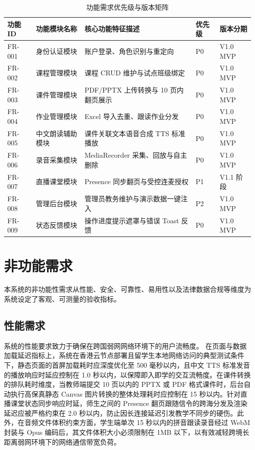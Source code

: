 \begin{table}[H]
\centering
\caption{功能需求优先级与版本矩阵}
\begin{tabularx}{\textwidth}{l l X l l}
\toprule
\textbf{功能 ID} & \textbf{功能模块名称} & \textbf{核心功能特征描述} & \textbf{优先级} & \textbf{版本分期} \\
\midrule
FR-001 & 身份认证模块 & 账户登录、角色识别与重定向 & P0 & V1.0 MVP \\
FR-002 & 课程管理模块 & 课程 CRUD 维护与试点班级绑定 & P0 & V1.0 MVP \\
FR-003 & 课件管理模块 & PDF/PPTX 上传转换与 10 页内翻页展示 & P0 & V1.0 MVP \\
FR-004 & 作业管理模块 & Excel 导入去重、跟读作业分发 & P0 & V1.0 MVP \\
FR-005 & 中文朗读辅助模块 & 课件关联文本语音合成 TTS 标准播放 & P0 & V1.0 MVP \\
FR-006 & 录音采集模块 & MediaRecorder 采集、回放与自主删除 & P0 & V1.0 MVP \\
FR-007 & 直播课堂模块 & Presence 同步翻页与受控连麦授权 & P1 & V1.1 阶段 \\
FR-008 & 管理后台模块 & 管理员教务维护与演示数据一键注入 & P2 & V1.0 MVP \\
FR-009 & 状态反馈模块 & 操作进度提示遮罩与错误 Toast 反馈 & P0 & V1.0 MVP \\
\bottomrule
\end{tabularx}
\end{table}

\section{非功能需求}
本系统的非功能性需求从性能、安全、可靠性、易用性以及法律数据合规等维度为系统设定了客观、可测量的验收指标。

\subsection{性能需求}
系统的性能要求致力于确保在跨国弱网网络环境下的用户流畅度。
在页面与数据加载延迟指标上，系统在香港云节点部署且留学生本地网络访问的典型测试条件下，静态页面的首屏加载耗时应深度优化至 500 毫秒以内，且中文 TTS 标准发音的播放响应时延应控制在 1.0 秒以内，以保障即入即学的交互流畅度。在课件转换的排队耗时维度，当教师端提交 10 页以内的 PPTX 或 PDF 格式课件时，后台自动执行高保真静态 Canvas 图片转换的整体处理耗时应控制在 15 秒以内。针对直播课堂状态同步响应时延，师生之间的 Presence 翻页跟随信令的跨海分发及渲染延迟应被严格约束在 2.0 秒以内，防止因长连接延迟引发教学不同步的硬伤。此外，在音频文件体积约束方面，学生端单次 15 秒以内的拼音跟读录音经过 WebM 封装与 Opus 编码后，其文件体积大小必须限制在 1MB 以下，以有效减轻跨境长距离弱网环境下的网络通信带宽负荷。

